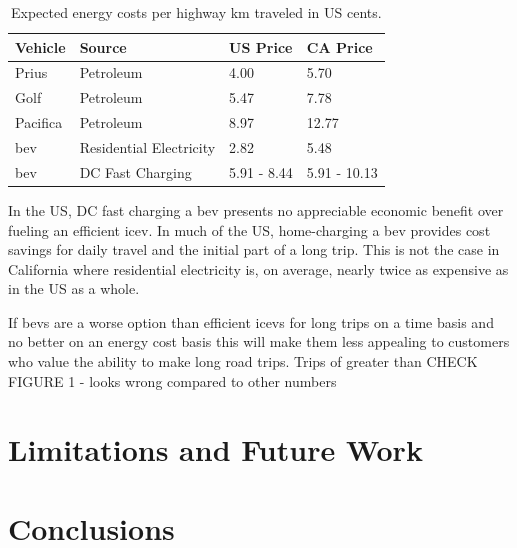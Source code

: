 \documentclass[11pt]{article}
\begin{document}
\begin{multicols}{2}
\begin{table}[H]
	\centering
	\caption{Expected energy costs per highway km traveled in US cents.}
	\label{tab:expected_energy_costs_per_km}
	\begin{tabular}{|C{\linewidth / 4}|C{\linewidth / 4}|C{\linewidth / 4}|C{\linewidth / 4}|}
		\hline Vehicle & Source & US Price & CA Price \\
		\hline Prius & Petroleum & 4.00 & 5.70 \\
		\hline Golf & Petroleum & 5.47 & 7.78 \\
		\hline Pacifica & Petroleum & 8.97 & 12.77 \\
		\hline \gls{bev} & Residential Electricity & 2.82 & 5.48 \\
		\hline \gls{bev} & DC Fast Charging & 5.91 - 8.44 & 5.91 - 10.13 \\
		\hline
	\end{tabular}
\end{table}

In the US, DC fast charging a \gls{bev} presents no appreciable economic benefit over fueling an efficient \gls{icev}. In much of the US, home-charging a \gls{bev} provides cost savings for daily travel and the initial part of a long trip. This is not the case in California where residential electricity is, on average, nearly twice as expensive as in the US as a whole.

If \glspl{bev} are a worse option than efficient \glspl{icev} for long trips on a time basis and no better on an energy cost basis this will make them less appealing to customers who value the ability to make long road trips. Trips of greater than CHECK FIGURE 1 - looks wrong compared to other numbers

\section*{Limitations and Future Work}

\section*{Conclusions}

 

\newpage

\printbibliography

\appendix


\end{multicols}
\end{document}
